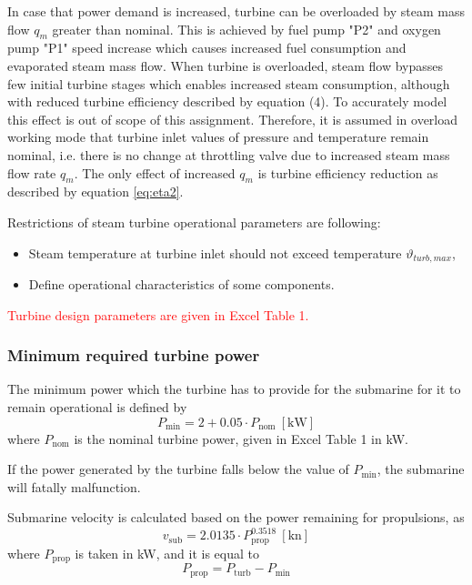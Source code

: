 \documentclass[openany]{book}
\begin{document}
	In case that power demand is increased, turbine can be overloaded by steam 
	mass flow $q_m$ greater than nominal. This is achieved by fuel pump "P2" 
	and oxygen pump "P1" speed increase which causes increased fuel consumption 
	and evaporated steam mass flow. When turbine is overloaded, steam flow 
	bypasses few initial turbine stages which enables increased steam 
	consumption, although with reduced turbine efficiency described by equation 
	(4). To accurately model this effect is out of scope of this assignment. 
	Therefore, it is assumed in overload working mode that turbine inlet values 
	of pressure and temperature remain nominal, i.e. there is no change at 
	throttling valve due to increased steam mass flow rate $q_m$. The only 
	effect of increased $q_m$ is turbine efficiency reduction as described by 
	equation \ref{eq:eta2}.
	
	Restrictions of steam turbine operational parameters are following:
	
	\begin{itemize}
		\item Steam temperature at turbine inlet should not exceed temperature 
		$\vartheta_{turb,max}$,
		\item Define operational characteristics of some components.
	\end{itemize}
	
	\noindent
	\textcolor{red}{Turbine design parameters are given in Excel Table 1.}
	
	\subsubsection*{Minimum required turbine power}
	
	The minimum power which the turbine has to provide for the submarine for it 
	to remain operational is defined by
	\begin{equation}\label{eq:minpower}
	P_\textrm{min} = 2 + 0.05 \cdot P_\textrm{nom} \ \left[\textrm{kW}\right]
	\end{equation}
	where $P_\textrm{nom}$ is the nominal turbine power, given in Excel Table 1 
	in kW.
	
	If the power generated by the turbine falls below the value of 
	$P_\textrm{min}$, the submarine will fatally malfunction.
	
	Submarine velocity is calculated based on the power remaining for 
	propulsions, as
	\begin{equation}
	v_\textrm{sub} = 2.0135 \cdot P_\textrm{prop}^{0.3518} \ 
	\left[\textrm{kn}\right]
	\end{equation}
	where $P_\textrm{prop}$ is taken in kW, and it is equal to
	\begin{equation}
	P_\textrm{prop} = P_\textrm{turb} - P_\textrm{min}
	\end{equation}
	
\end{document}
